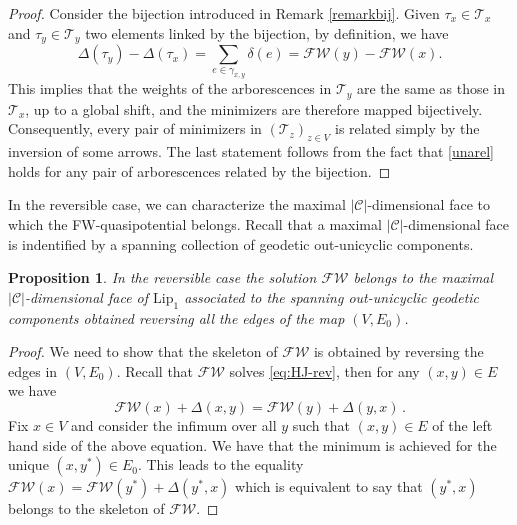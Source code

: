 \documentclass[reqno]{amsart}
\theoremstyle{plain}
\newtheorem{proposition}[theorem]{Proposition}
\theoremstyle{definition}
\theoremstyle{remark}
\numberwithin{equation}{section}
\numberwithin{theorem}{section}
\newcommand{\<}{\langle}
\renewcommand{\>}{\rangle}
\begin{document}
\begin{proof}
	Consider the bijection introduced in Remark \ref{remarkbij}. Given ${\mathcal \tau}_x\in{\mathcal T}_x$ and ${\mathcal \tau}_y\in{\mathcal T}_y$ two elements linked by the bijection, by definition, we have 
	\begin{equation}\label{unarel}
		\Delta\left({\mathcal \tau}_y\right)-\Delta\left({\mathcal \tau}_x\right)=\sum_{e\in \gamma_{x,y}}\delta(e)=\mathscr{FW}(y)-\mathscr{FW}(x).
	\end{equation}
	This implies that the weights of the arborescences in $\mathcal T_y$ are the same as those in $\mathcal T_x$, up to a global shift, and the minimizers are therefore mapped bijectively. Consequently, every pair of minimizers in $(\mathcal T_z)_{z\in V}$ is related simply by the inversion of some arrows. The last statement follows from the fact that \eqref{unarel} holds for any pair of arborescences related by the bijection.
\end{proof}

In the reversible case, we can characterize the maximal $|\mathcal C|$-dimensional face to which the FW-quasipotential belongs.  Recall that a maximal $|\mathcal C|$-dimensional face is indentified by a spanning collection of geodetic out-unicyclic components. 
\begin{proposition}
	In the reversible case the solution $\mathscr{FW}$ belongs to the maximal $|\mathcal C|$-dimensional face of $\mathrm{Lip}_1$ associated to the spanning out-unicyclic geodetic components obtained reversing all the edges of the map $(V,E_0)$.
\end{proposition}
\begin{proof}
	We need to show that the skeleton of $\mathscr{FW}$ is obtained by reversing the edges in $(V,E_0)$. Recall that $\mathscr{FW}$ solves \eqref{eq:HJ-rev}, then for any $(x,y)\in E$ we have
	\[
	\mathscr{FW}(x)+\Delta(x,y)=\mathscr{FW}(y)+\Delta(y,x)\,.
	\]
	Fix $x\in V$ and consider the infimum over all $y$ such that $(x,y)\in E$ of the left hand side of the above equation.  We have that the minimum is achieved for the unique $(x,y^*)\in E_0$. This leads to  the equality
	$\mathscr{FW}(x)=\mathscr{FW}(y^*)+\Delta(y^*,x)$ which is equivalent to say that $(y^*,x)$ belongs to the skeleton of $\mathscr{FW}$.
\end{proof}
\end{document}
